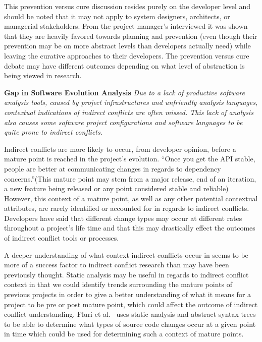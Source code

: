 \documentclass[conference]{IEEEtran}
\begin{document}
This prevention versus cure discussion resides purely on the developer level and should be noted that it may not apply to system
designers, architects, or managerial stakeholders.
From the project manager's interviewed it was shown that they are heavily favored towards planning and
prevention (even though their prevention may be on more abstract levels than developers actually need) while leaving the curative
approaches to their developers. The prevention versus cure debate may have different outcomes depending on what level of abstraction
is being viewed in research.

\textbf{Gap in Software Evolution Analysis} \textit{Due to a lack of productive software analysis tools, caused by project infrastructures
and unfriendly analysis languages, contextual indications of indirect conflicts are often missed. This lack of analysis also causes
some software project configurations and software languages to be quite prone to indirect conflicts.}

Indirect conflicts are more likely to occur,
from developer opinion, before a mature point is reached in the project's evolution. ``Once you get the API stable, people are
better at communicating changes in regards to dependency concerns.''(This mature point may stem from a major release,
end of an iteration, a new feature being released or any point considered stable and reliable) However, this context of a
mature point, as well as any other
potential contextual attributes, are rarely identified or accounted for in regards to indirect conflicts. Developers have said
that different change types may occur at different rates throughout a project's life time and that this
may drastically effect the outcomes of indirect conflict tools or processes.

A deeper understanding of what context indirect conflicts occur in seems to be more of a success factor to indirect conflict
research than may have been previously thought. Static analysis may be useful in regards to indirect conflict context in that we
could identify trends surrounding the mature points of previous projects in order to give a better understanding of what it
means for a project to be pre or post mature point, which could affect the outcome of indirect conflict understanding.
Fluri et al.~\cite{Fluri:2007:CDT} uses static analysis and abstract syntax trees to be able to determine what types of source code
changes occur at a given point in time which could be used for determining such a context of mature points.
\end{document}
